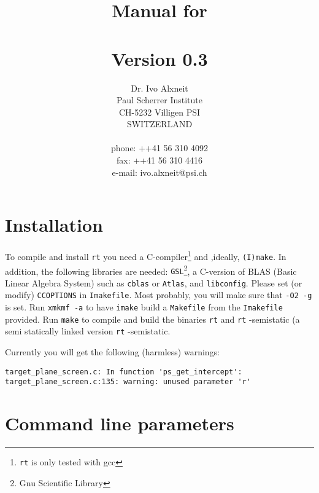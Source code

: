\documentclass[10pt,a4paper,titlepage]{article}
\title{ {\Huge Manual for \\
		\rt \\
		Version 0.3\\
		\vspace{2cm}}}
\author{Dr. Ivo Alxneit \\
	Paul Scherrer Institute \\
	CH-5232 Villigen PSI \\
	SWITZERLAND \\
	\\
	phone: ++41 56 310 4092 \\
	fax: ++41 56 310 4416 \\
	e-mail: ivo.alxneit@psi.ch \\
	\vspace{4cm}}
\newcommand{\rt}{{\tt rt} }
\begin{document}
\maketitle

\tableofcontents
\pagebreak

\setcounter{page}{1}



\section{Installation}

To compile and install \rt you need a C-compiler\footnote{\rt is only tested with gcc} and ,ideally, {\tt (I)make}. In addition, the following libraries are needed: {\tt GSL}\footnote{Gnu Scientific Library}, a C-version of BLAS (Basic Linear Algebra System) such as {\tt cblas} or {\tt Atlas}, and {\tt libconfig}. Please set (or modify) {\tt CCOPTIONS} in {\tt Imakefile}. Most probably, you will make sure that {\tt -O2 -g} is set. Run {\tt xmkmf -a} to have {\tt imake} build a {\tt Makefile} from the {\tt Imakefile} provided. Run {\tt make} to compile and build the binaries \rt and {\rt-semistatic} (a semi statically linked version {\rt-semistatic}.

Currently you will get the following (harmless) warnings:

\begin{verbatim}
target_plane_screen.c: In function 'ps_get_intercept':
target_plane_screen.c:135: warning: unused parameter 'r'
\end{verbatim}



\section{Command line parameters}
\end{document}
